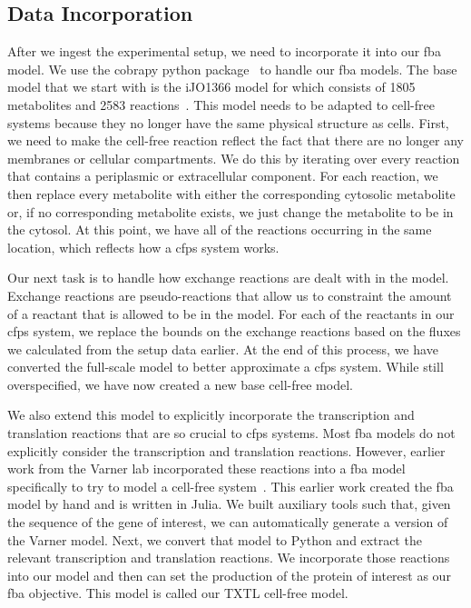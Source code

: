 \subsection{Data Incorporation} \label{sec:incorp}
After we ingest the experimental setup, we need to incorporate it into our \gls{fba} model.
We use the \gls{cobra}py python package~\cite{ebrahim2013cobrapy} to handle our \gls{fba} models.
The base model that we start with is the iJO1366 model for \ecoli which consists of 1805 metabolites and 2583 reactions~\cite{orth2011comprehensive}.
This model needs to be adapted to cell-free systems because they no longer have the same physical structure as \ecoli cells.
First, we need to make the cell-free reaction reflect the fact that there are no longer any membranes or cellular compartments.
We do this by iterating over every reaction that contains a periplasmic or extracellular component.
For each reaction, we then replace every metabolite with either the corresponding cytosolic metabolite or, if no corresponding metabolite exists, we just change the metabolite to be in the cytosol.
At this point, we have all of the reactions occurring in the same location, which reflects how a \gls{cfps} system works.

Our next task is to handle how exchange reactions are dealt with in the model.
Exchange reactions are pseudo-reactions that allow us to constraint the amount of a reactant that is allowed to be in the model.
For each of the reactants in our \gls{cfps} system, we replace the bounds on the exchange reactions based on the fluxes we calculated from the setup data earlier.
At the end of this process, we have converted the full-scale \ecoli model to better approximate a \gls{cfps} system.
While still overspecified, we have now created a new base cell-free model.

We also extend this model to explicitly incorporate the transcription and translation reactions that are so crucial to \gls{cfps} systems.
Most \gls{fba} models do not explicitly consider the transcription and translation reactions.
However, earlier work from the Varner lab incorporated these reactions into a \gls{fba} model specifically to try to model a cell-free system~\cite{vilkhovoy2017sequence}.
This earlier work created the \gls{fba} model by hand and is written in Julia.
We built auxiliary tools such that, given the sequence of the gene of interest, we can automatically generate a version of the Varner model.
Next, we convert that model to Python and extract the relevant transcription and translation reactions.
We incorporate those reactions into our model and then can set the production of the protein of interest as our \gls{fba} objective.
This model is called our TXTL cell-free model.

